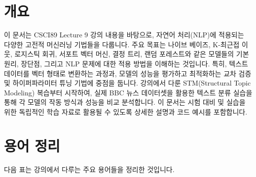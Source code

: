 \documentclass[11pt,a4paper]{article}
\theoremstyle{definition}
\begin{document}
\newpage
\section*{개요}

이 문서는 CSCI89 Lecture 9 강의 내용을 바탕으로, 자연어 처리(NLP)에 적용되는 다양한 고전적 머신러닝 기법들을 다룹니다.
주요 목표는 나이브 베이즈, K-최근접 이웃, 로지스틱 회귀, 서포트 벡터 머신, 결정 트리, 랜덤 포레스트와 같은 모델들의 기본 원리, 장단점, 그리고 NLP 문제에 대한 적용 방법을 이해하는 것입니다.
특히, 텍스트 데이터를 벡터 형태로 변환하는 과정과, 모델의 성능을 평가하고 최적화하는 교차 검증 및 하이퍼파라미터 튜닝 기법에 중점을 둡니다.
강의에서 다룬 STM(Structural Topic Modeling) 복습부터 시작하여, 실제 BBC 뉴스 데이터셋을 활용한 텍스트 분류 실습을 통해 각 모델의 작동 방식과 성능을 비교 분석합니다.
이 문서는 시험 대비 및 실습을 위한 독립적인 학습 자료로 활용될 수 있도록 상세한 설명과 코드 예시를 포함합니다.

\newpage
\section*{용어 정리}

다음 표는 강의에서 다루는 주요 용어들을 정리한 것입니다.
\end{document}
